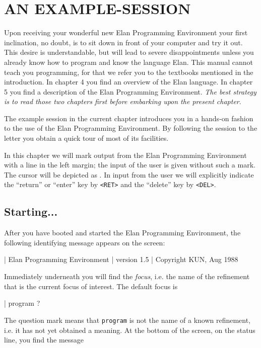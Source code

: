 \chapter{AN EXAMPLE-SESSION}

Upon receiving your wonderful new Elan Programming Environment
your first inclination, no doubt, is to sit down in front of
your computer and try it out. This desire is understandable,
but will lead to severe disappointments unless you already know
how to program and know the language Elan. This manual cannot
teach you programming, for that we refer you to the textbooks
mentioned in the introduction. In chapter 4 you find an overview
of the Elan language. In chapter 5 you find a description of the
Elan Programming Environment. {\em The best strategy is to
read those two chapters first before embarking upon the present
chapter}.

The example session in the current chapter introduces you in
a hands-on fashion to the use of the Elan Programming Environment.
By following the session to the letter you obtain a quick tour
of most of its facilities.

In this chapter we will mark output from the Elan Programming Environment
with a line in the left margin; the input of the user is given
without such a mark. The cursor will be depicted as \cursor. In input
from the user we will explicitly indicate the ``return'' or ``enter''
key by {\tt <RET>} and the ``delete'' key by {\tt <DEL>}.

\section{Starting...}

After you have booted and started the Elan Programming Environment,
the following identifying message appears on the screen:

\begin{elan}
|       Elan Programming Environment
|       version 1.5
|       Copyright KUN, Aug 1988
\end{elan}

\noindent
Immediately underneath you will find the {\em focus}, i.e. the
name of the refinement that is the current focus of interest.
The default focus is

\begin{elan}
|       program ?\cursor
\end{elan}

\noindent
The question mark means that {\tt program} is not the name of
a known refinement, i.e. it has not yet obtained a meaning. At
the bottom of the screen, on the status line, you find the message

